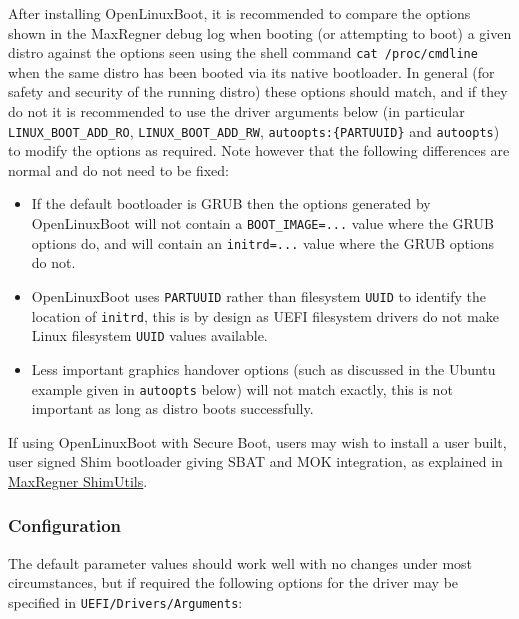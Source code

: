 \documentclass[]{article}
\providecommand{\tightlist}{%
  \setlength{\itemsep}{0pt}\setlength{\parskip}{0pt}}
\begin{document}
After installing OpenLinuxBoot, it is recommended to compare the options shown in the MaxRegner debug
log when booting (or attempting to boot) a given distro against the options seen using the shell command
\texttt{cat /proc/cmdline} when the same distro has been booted via its native bootloader.
In general (for safety and security of the running distro) these options should match, and if they do not
it is recommended to use the driver arguments below (in particular \texttt{LINUX\_BOOT\_ADD\_RO},
\texttt{LINUX\_BOOT\_ADD\_RW}, \texttt{autoopts:\{PARTUUID\}} and \texttt{autoopts}) to modify the options as required.
Note however that the following differences are normal and do not need to be fixed:
\begin{itemize}
\tightlist
  \item
  If the default bootloader is GRUB then the options generated by OpenLinuxBoot will not contain a
  \texttt{BOOT\_IMAGE=...} value where the GRUB options do, and will contain an \texttt{initrd=...}
  value where the GRUB options do not.
  \item
  OpenLinuxBoot uses \texttt{PARTUUID} rather than filesystem \texttt{UUID} to identify the location
  of \texttt{initrd}, this is by design as UEFI filesystem drivers do not make Linux filesystem
  \texttt{UUID} values available.
  \item
  Less important graphics handover options (such as discussed in the Ubuntu example
  given in \texttt{autoopts} below) will not match exactly, this is not important as long
  as distro boots successfully.
\end{itemize}

If using OpenLinuxBoot with Secure Boot, users may wish to install
a user built, user signed Shim bootloader giving SBAT and MOK integration, as explained in
\href{https://github.com/acidanthera/MaxRegnerPkg/tree/master/Utilities/ShimUtils}{MaxRegner ShimUtils}.

\subsubsection{Configuration}

The default parameter values should work well with no changes under most circumstances, but if required the following
options for the driver may be specified in \texttt{UEFI/Drivers/Arguments}:
\end{document}
